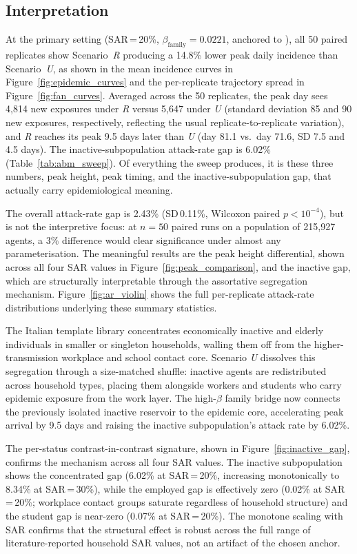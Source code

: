 \documentclass{article}
\begin{document}
\subsection*{Interpretation}

At the primary setting (SAR\,=\,20\%, $\beta_\mathrm{family} = 0.0221$, anchored to \citet{madewell2020household}), all 50 paired replicates show Scenario~\textit{R} producing a 14.8\% lower peak daily incidence than Scenario~\textit{U}, as shown in the mean incidence curves in Figure~\ref{fig:epidemic_curves} and the per-replicate trajectory spread in Figure~\ref{fig:fan_curves}. Averaged across the 50 replicates, the peak day sees 4,814 new exposures under \textit{R} versus 5,647 under \textit{U} (standard deviation 85 and 90 new exposures, respectively, reflecting the usual replicate-to-replicate variation), and \textit{R} reaches its peak 9.5 days later than \textit{U} (day 81.1 vs.\ day 71.6, SD 7.5 and 4.5 days). The inactive-subpopulation attack-rate gap is 6.02\%
(Table~\ref{tab:abm_sweep}). Of everything the sweep produces, it is these three numbers, peak height, peak timing, and the inactive-subpopulation gap, that actually carry epidemiological meaning.

The overall attack-rate gap is 2.43\% (SD\,0.11\%, Wilcoxon paired
$p < 10^{-4}$), but is not the interpretive focus: at $n = 50$ paired runs on a population
of 215,927 agents, a 3\% difference would clear significance under almost any
parameterisation. The meaningful results are the peak height differential, shown across all four SAR values in Figure~\ref{fig:peak_comparison}, and the inactive
gap, which are structurally interpretable through the assortative segregation mechanism. Figure~\ref{fig:ar_violin} shows the full per-replicate attack-rate distributions underlying these summary statistics.

The Italian template library concentrates economically inactive and elderly individuals in
smaller or singleton households, walling them off from the higher-transmission workplace
and school contact core. Scenario \textit{U} dissolves this segregation through a size-matched
shuffle: inactive agents are redistributed across household types, placing them alongside
workers and students who carry epidemic exposure from the work layer. The high-$\beta$
family bridge now connects the previously isolated inactive reservoir to the epidemic core,
accelerating peak arrival by 9.5 days and raising the inactive subpopulation's attack rate
by 6.02\%.

The per-status contrast-in-contrast signature, shown in Figure~\ref{fig:inactive_gap}, confirms the mechanism across all four SAR
values. The inactive subpopulation shows the concentrated gap (6.02\% at SAR\,=\,20\%,
increasing monotonically to 8.34\% at SAR\,=\,30\%), while the employed gap is
effectively zero (0.02\% at SAR\,=\,20\%; workplace contact groups saturate regardless
of household structure) and the student gap is near-zero (0.07\% at SAR\,=\,20\%).
The monotone scaling with SAR confirms that the structural effect is robust across the full
range of literature-reported household SAR values, not an artifact of the chosen anchor.
\end{document}
